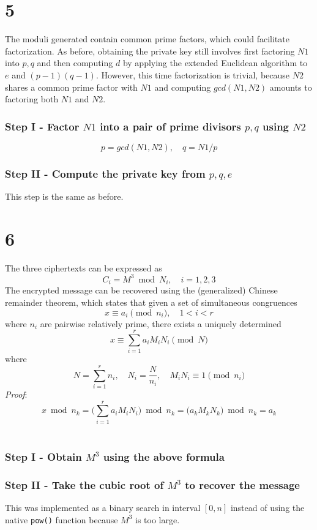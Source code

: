 \documentclass[11pt]{article}
\begin{document}
\section*{5}
The moduli generated contain common prime factors, which could facilitate factorization.
As before, obtaining the private key still involves first factoring $N1$ into $p,q$ and then computing $d$ by applying the extended Euclidean algorithm to $e$ and $(p-1)(q-1)$. However, this time factorization is trivial, because $N2$ shares a common prime factor with $N1$ and computing $gcd(N1,N2)$ amounts to factoring both $N1$ and $N2$.
\subsubsection*{Step I - Factor $N1$ into a pair of prime divisors $p, q$ using $N2$}
\[p = gcd(N1, N2), \quad q = N1/p \]
\subsubsection*{Step II - Compute the private key from $p,q,e$} This step is the same as before.


\section*{6}
The three ciphertexts can be expressed as
\[ C_i = M^3 \bmod{N_i},\quad i = 1,2,3 \]
The encrypted message can be recovered using the (generalized) Chinese remainder theorem, which states that given a set of simultaneous congruences
\[ x \equiv a_i \pmod{n_i}, \quad 1 < i < r \]
where $n_i$ are pairwise relatively prime, there exists a uniquely determined
\[ x \equiv \sum_{i=1}^{r}a_iM_iN_i \pmod{N} \]
where
\[ N = \sum_{i=1}^r n_i,\quad N_i = \frac{N}{n_i}, \quad M_i N_i \equiv 1 \pmod{n_i} \]
\textit{Proof}: \[ x\bmod{n_k} = \Big(\sum_{i=1}^{r}a_iM_iN_i\Big) \bmod{n_k} = \Big(a_kM_kN_k\Big) \bmod{n_k} = a_k \]\\
\subsubsection*{Step I - Obtain $M^3$ using the above formula}
\subsubsection*{Step II - Take the cubic root of $M^3$ to recover the message} This was implemented as a binary search in interval $[0, n]$ instead of using the native \verb|pow()| function because $M^3$ is too large.
\end{document}
